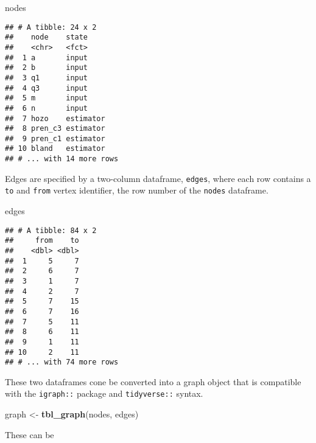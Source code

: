 \documentclass[
]{article}
\newenvironment{Shaded}{\begin{snugshade}}{\end{snugshade}}
\newcommand{\KeywordTok}[1]{\textcolor[rgb]{0.13,0.29,0.53}{\textbf{#1}}}
\newcommand{\NormalTok}[1]{#1}
\newcommand{\StringTok}[1]{\textcolor[rgb]{0.31,0.60,0.02}{#1}}
\begin{document}
\begin{Shaded}
\begin{Highlighting}[]
\NormalTok{nodes}
\end{Highlighting}
\end{Shaded}

\begin{verbatim}
## # A tibble: 24 x 2
##    node    state    
##    <chr>   <fct>    
##  1 a       input    
##  2 b       input    
##  3 q1      input    
##  4 q3      input    
##  5 m       input    
##  6 n       input    
##  7 hozo    estimator
##  8 pren_c3 estimator
##  9 pren_c1 estimator
## 10 bland   estimator
## # ... with 14 more rows
\end{verbatim}

Edges are specified by a two-column dataframe, \texttt{edges}, where
each row contains a \texttt{to} and \texttt{from} vertex identifier, the
row number of the \texttt{nodes} dataframe.

\begin{Shaded}
\begin{Highlighting}[]
\NormalTok{edges}
\end{Highlighting}
\end{Shaded}

\begin{verbatim}
## # A tibble: 84 x 2
##     from    to
##    <dbl> <dbl>
##  1     5     7
##  2     6     7
##  3     1     7
##  4     2     7
##  5     7    15
##  6     7    16
##  7     5    11
##  8     6    11
##  9     1    11
## 10     2    11
## # ... with 74 more rows
\end{verbatim}

These two dataframes cone be converted into a graph object that is
compatible with the \texttt{igraph::} package and \texttt{tidyverse::}
syntax.

\begin{Shaded}
\begin{Highlighting}[]
\NormalTok{graph <{-}}\StringTok{ }\KeywordTok{tbl\_graph}\NormalTok{(nodes, edges)}
\end{Highlighting}
\end{Shaded}

These can be
\end{document}
